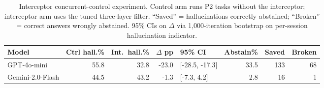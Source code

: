 \begin{table}[t]
\centering
\caption{Interceptor concurrent-control experiment. Control arm runs P2 tasks without the interceptor; interceptor arm uses the tuned three-layer filter. ``Saved'' = hallucinations correctly abstained; ``Broken'' = correct answers wrongly abstained. 95\% CIs on $\Delta$ via 1{,}000-iteration bootstrap on per-session hallucination indicator.}
\label{tab:interceptor}
\small
\begin{tabular}{l r r r l r r r}
\toprule
Model & Ctrl hall.\% & Int.\ hall.\% & $\Delta$ pp & 95\% CI & Abstain\% & Saved & Broken \\
\midrule
GPT-4o-mini & 55.8 & 32.8 & -23.0 & [-28.5, -17.3] & 33.5 & 133 & 68 \\
Gemini-2.0-Flash & 44.5 & 43.2 & -1.3 & [-7.3, 4.2] & 2.8 & 16 & 1 \\
\bottomrule
\end{tabular}
\end{table}
